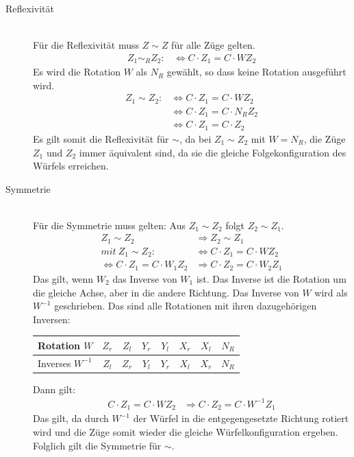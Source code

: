 \documentclass[12pt,a4paper, usenames, dvipsnames]{article}
\theoremstyle{mystyle}
\theoremstyle{definition}
\begin{document}
\begin{description}


\item [Reflexivität] \ \\
Für die Reflexivität muss $Z \sim Z$ für alle Züge gelten. 
\begin{align*}
Z_1 \sim_R Z_2 : & \Leftrightarrow C \cdot Z_1 = C \cdot WZ_2
\end{align*}
Es wird die Rotation $W$ als $N_R$ gewählt, so dass keine Rotation ausgeführt wird.
\begin{align*}
Z_1 \sim Z_2 : & \Leftrightarrow  C \cdot Z_1 = C \cdot WZ_2 \\
\ & \Leftrightarrow C \cdot Z_1=C \cdot N_R Z_2 \\
\ & \Leftrightarrow C \cdot Z_1 = C \cdot Z_2
\end{align*}
Es gilt somit die Reflexivität für $\sim$, da bei $Z_1 \sim Z_2$ mit $W=N_R$, die Züge $Z_1$ und $Z_2$ immer äquivalent sind, da sie die gleiche Folgekonfiguration des Würfels erreichen.

\item [Symmetrie] \ \\
Für die Symmetrie muss gelten: Aus $Z_1 \sim Z_2$ folgt $Z_2 \sim Z_1$.
\begin{align*}
Z_1 \sim Z_2 & \Rightarrow Z_2 \sim Z_1 \\
mit \ Z_1 \sim Z_2 : & \Leftrightarrow  C \cdot  Z_1 = C \cdot  WZ_2 \\
\Leftrightarrow C \cdot  Z_1 = C \cdot  W_1 Z_2 & \Rightarrow C \cdot  Z_2 = C \cdot  W_2 Z_1
\end{align*}
Das gilt, wenn $W_2$ das Inverse von $W_1$ ist. Das Inverse ist die Rotation um die gleiche Achse, aber in die andere Richtung. 
Das Inverse von $W$ wird als $W^{-1}$ geschrieben.
Das sind alle Rotationen mit ihren dazugehörigen Inversen:

\begin{center}
\begin{tabular}{lccccccc}
Rotation $W$ & ${Z_r}$ & ${Z_l}$ &  ${Y_r}$ & ${Y_l}$ & ${X_r}$ & ${X_l}$ & $N_R$ \\
\hline
Inverses \hspace*{0.1em} $W^{-1}$ & ${Z_l}$ & ${Z_r}$ &  ${Y_l}$ & ${Y_r}$ & ${X_l}$ & ${X_r}$ & $N_R$ \\
\end{tabular} 
\end{center}
Dann gilt: 
\begin{align*}
C \cdot  Z_1 = C \cdot  W Z_2 & \Rightarrow C \cdot  Z_2 = C \cdot  W^{-1} Z_1
\end{align*}
Das gilt, da durch $W^{-1}$ der Würfel in die entgegengesetzte Richtung rotiert wird und die Züge somit wieder die gleiche Würfelkonfiguration ergeben.
Folglich gilt die Symmetrie für $\sim$.



\end{description}
\end{document}
